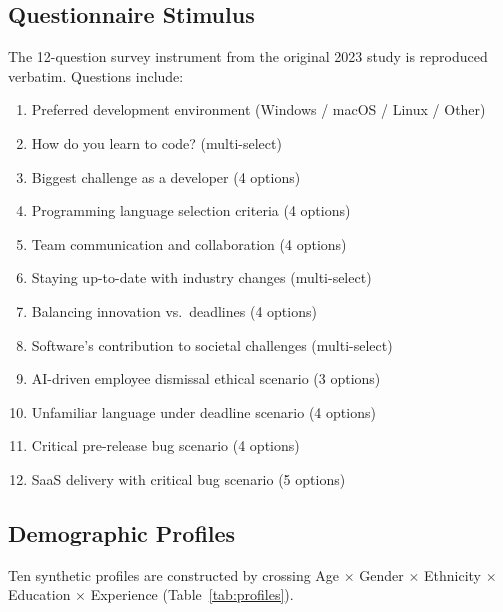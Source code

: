 \documentclass[11pt,a4paper]{article}
\begin{document}
\subsection{Questionnaire Stimulus}

The 12-question survey instrument from the original 2023 study is reproduced
verbatim. Questions include:

\begin{enumerate}[noitemsep]
  \item Preferred development environment (Windows / macOS / Linux / Other)
  \item How do you learn to code? (multi-select)
  \item Biggest challenge as a developer (4 options)
  \item Programming language selection criteria (4 options)
  \item Team communication and collaboration (4 options)
  \item Staying up-to-date with industry changes (multi-select)
  \item Balancing innovation vs.\ deadlines (4 options)
  \item Software's contribution to societal challenges (multi-select)
  \item AI-driven employee dismissal ethical scenario (3 options)
  \item Unfamiliar language under deadline scenario (4 options)
  \item Critical pre-release bug scenario (4 options)
  \item SaaS delivery with critical bug scenario (5 options)
\end{enumerate}

\subsection{Demographic Profiles}

Ten synthetic profiles are constructed by crossing Age $\times$ Gender
$\times$ Ethnicity $\times$ Education $\times$ Experience
(Table~\ref{tab:profiles}).
\end{document}

